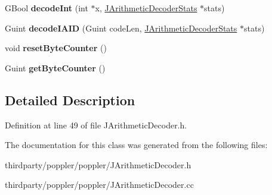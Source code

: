 \begin{DoxyCompactItemize}
G\+Bool {\bfseries decode\+Int} (int $\ast$x, \hyperlink{class_j_arithmetic_decoder_stats}{J\+Arithmetic\+Decoder\+Stats} $\ast$stats)
\item 
\mbox{\label{class_j_arithmetic_decoder_a79eee000b7d324580b022076189b42d9}} 
Guint {\bfseries decode\+I\+A\+ID} (Guint code\+Len, \hyperlink{class_j_arithmetic_decoder_stats}{J\+Arithmetic\+Decoder\+Stats} $\ast$stats)
\item 
\mbox{\label{class_j_arithmetic_decoder_ad23ee807e7c64f40d390acc55adc921d}} 
void {\bfseries reset\+Byte\+Counter} ()
\item 
\mbox{\label{class_j_arithmetic_decoder_afc636c4320a1b62b90d389a891e9fd41}} 
Guint {\bfseries get\+Byte\+Counter} ()
\end{DoxyCompactItemize}


\subsection{Detailed Description}


Definition at line 49 of file J\+Arithmetic\+Decoder.\+h.



The documentation for this class was generated from the following files\+:\begin{DoxyCompactItemize}
\item 
thirdparty/poppler/poppler/J\+Arithmetic\+Decoder.\+h\item 
thirdparty/poppler/poppler/J\+Arithmetic\+Decoder.\+cc\end{DoxyCompactItemize}
